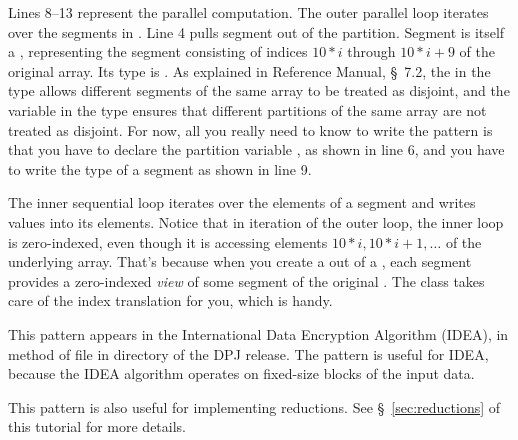 Lines 8--13 represent the parallel computation.  The outer parallel
 loop iterates over the segments in .  Line 4
pulls segment  out of the partition.  Segment  is itself
a , representing the segment consisting of indices
$10*i$ through $10*i+9$ of the original array.  Its type is
.  As explained in Reference Manual, \S~7.2,
the \kwd{[i]} in the type allows different segments of the same array
to be treated as disjoint, and the variable  in the type
ensures that different partitions of the same array are not treated as
disjoint.  For now, all you really need to know to write the pattern
is that you have to declare the partition variable 
, as shown in line 6, and you have to write the type of a
segment as shown in line 9.

The inner sequential loop iterates over the elements of a segment and
writes values into its elements.  Notice that in iteration  of
the outer loop, the inner loop is zero-indexed, even though it is
accessing elements $10*i, 10*i+1, \ldots$ of the underlying array.
That's because when you create a  out of a
, each segment provides a zero-indexed \emph{view} of
some segment of the original .  The  class
takes care of the index translation for you, which is handy.

 This pattern appears in the International
Data Encryption Algorithm (IDEA), in method  of file
 in directory
 of the DPJ release.  The
pattern is useful for IDEA, because the IDEA algorithm operates on
fixed-size blocks of the input data.

This pattern is also useful for implementing reductions.  See
\S~\ref{sec:reductions} of this tutorial for more details.

